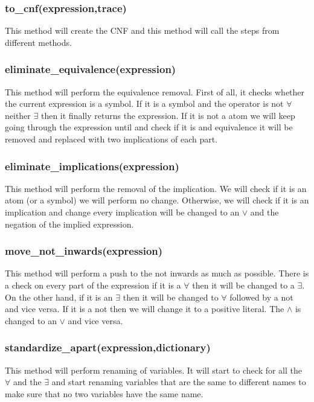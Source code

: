 {\subsubsection{to\_cnf(expression,trace)}
This method will create the CNF and this method will call the steps from different methods.

\subsubsection{eliminate\_equivalence(expression)}
This method will perform the equivalence removal. First of all,  it checks whether the current expression is a symbol. If it is a symbol and the operator is not $\forall$ neither $\exists$ then it finally returns the expression.  If it is not a atom we will keep going through the expression until and check if it is and equivalence it will be removed and replaced with two implications of each part.

\subsubsection{eliminate\_implications(expression)}
This method will perform the removal of the implication. We will check if it is an atom (or a symbol) we will perform no change. Otherwise, we will check if it is an implication and change every implication will be changed to an $\vee$ and the negation of the implied expression.

\subsubsection{move\_not\_inwards(expression)}
This method will perform a push to the not inwards as much as possible. There is a check on every part of the expression if it is a $\forall$ then it will be changed to a $\exists$. On the other hand, if it is an $\exists$ then it will be changed to $\forall$ followed by a not and vice versa. If it is a not then we will change it to a positive literal. The $\wedge$ is changed to an $\vee$ and vice versa.

\subsubsection{standardize\_apart(expression,dictionary)}
 This method will perform renaming of variables. It will start to check for all the $\forall$ and the $\exists$ and start renaming variables that are the same to different names to make sure that no two variables have the same name.
 
}
